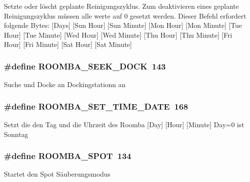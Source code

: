 Setzte oder löscht geplante Reinigungszyklus. Zum deaktivieren eines geplante Reinigungszyklus müssen alle werte auf 0 gesetzt werden. Dieser Befehl erfordert folgende Bytes\-: \mbox{[}Days\mbox{]} \mbox{[}Sun Hour\mbox{]} \mbox{[}Sun Minute\mbox{]} \mbox{[}Mon Hour\mbox{]} \mbox{[}Mon Minute\mbox{]} \mbox{[}Tue Hour\mbox{]} \mbox{[}Tue Minute\mbox{]} \mbox{[}Wed Hour\mbox{]} \mbox{[}Wed Minute\mbox{]} \mbox{[}Thu Hour\mbox{]} \mbox{[}Thu Minute\mbox{]} \mbox{[}Fri Hour\mbox{]} \mbox{[}Fri Minute\mbox{]} \mbox{[}Sat Hour\mbox{]} \mbox{[}Sat Minute\mbox{]} \hypertarget{group__roomba__commands__clean_ga72e1f19b34da8d7659728d4b2fb6c8c7}{
\subsubsection[{R\-O\-O\-M\-B\-A\-\_\-\-S\-E\-E\-K\-\_\-\-D\-O\-C\-K}]{\setlength{\rightskip}{0pt plus 5cm}\#define R\-O\-O\-M\-B\-A\-\_\-\-S\-E\-E\-K\-\_\-\-D\-O\-C\-K~143}}\label{group__roomba__commands__clean_ga72e1f19b34da8d7659728d4b2fb6c8c7}
Suche und Docke an Dockingstationn an \hypertarget{group__roomba__commands__clean_gab0a596543df5f5c2dc57dc78fcb11a1d}{
\subsubsection[{R\-O\-O\-M\-B\-A\-\_\-\-S\-E\-T\-\_\-\-T\-I\-M\-E\-\_\-\-D\-A\-T\-E}]{\setlength{\rightskip}{0pt plus 5cm}\#define R\-O\-O\-M\-B\-A\-\_\-\-S\-E\-T\-\_\-\-T\-I\-M\-E\-\_\-\-D\-A\-T\-E~168}}\label{group__roomba__commands__clean_gab0a596543df5f5c2dc57dc78fcb11a1d}
Setzt die den Tag und die Uhrzeit des Roomba \mbox{[}Day\mbox{]} \mbox{[}Hour\mbox{]} \mbox{[}Minute\mbox{]} Day=0 ist Sonntag \hypertarget{group__roomba__commands__clean_ga320c7d7d833d22b3040f0575f19fd6e3}{
\subsubsection[{R\-O\-O\-M\-B\-A\-\_\-\-S\-P\-O\-T}]{\setlength{\rightskip}{0pt plus 5cm}\#define R\-O\-O\-M\-B\-A\-\_\-\-S\-P\-O\-T~134}}\label{group__roomba__commands__clean_ga320c7d7d833d22b3040f0575f19fd6e3}
Startet den Spot Säuberungsmodus 